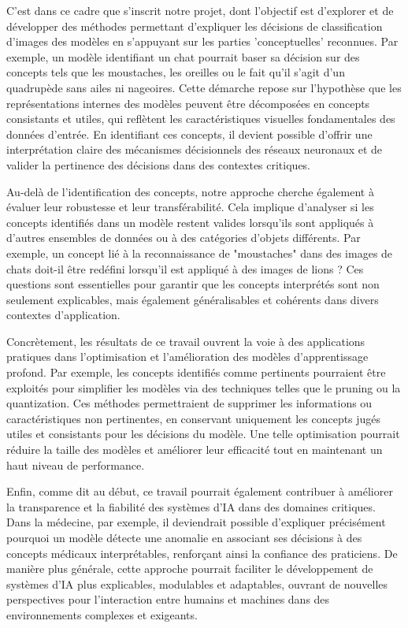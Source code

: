 \documentclass[runningheads]{llncs}
\begin{document}
C’est dans ce cadre que s’inscrit notre projet, dont l’objectif est d’explorer et de développer des méthodes permettant d’expliquer les décisions de classification d’images des modèles en s’appuyant sur les parties 'conceptuelles' reconnues. Par exemple, un modèle identifiant un chat pourrait baser sa décision sur des concepts tels que les moustaches, les oreilles ou le fait qu’il s’agit d’un quadrupède sans ailes ni nageoires. Cette démarche repose sur l’hypothèse que les représentations internes des modèles peuvent être décomposées en concepts consistants et utiles, qui reflètent les caractéristiques visuelles fondamentales des données d’entrée. En identifiant ces concepts, il devient possible d’offrir une interprétation claire des mécanismes décisionnels des réseaux neuronaux et de valider la pertinence des décisions dans des contextes critiques.
\bigskip

Au-delà de l’identification des concepts, notre approche cherche également à évaluer leur robustesse et leur transférabilité. Cela implique d’analyser si les concepts identifiés dans un modèle restent valides lorsqu’ils sont appliqués à d’autres ensembles de données ou à des catégories d’objets différents. Par exemple, un concept lié à la reconnaissance de "moustaches" dans des images de chats doit-il être redéfini lorsqu’il est appliqué à des images de lions ? Ces questions sont essentielles pour garantir que les concepts interprétés sont non seulement explicables, mais également généralisables et cohérents dans divers contextes d’application.
\bigskip

Concrètement, les résultats de ce travail ouvrent la voie à des applications pratiques dans l’optimisation et l’amélioration des modèles d’apprentissage profond. Par exemple, les concepts identifiés comme pertinents pourraient être exploités pour simplifier les modèles via des techniques telles que le pruning ou la quantization. Ces méthodes permettraient de supprimer les informations ou caractéristiques non pertinentes, en conservant uniquement les concepts jugés utiles et consistants pour les décisions du modèle. Une telle optimisation pourrait réduire la taille des modèles et améliorer leur efficacité tout en maintenant un haut niveau de performance.
\bigskip

Enfin, comme dit au début, ce travail pourrait également contribuer à améliorer la transparence et la fiabilité des systèmes d’IA dans des domaines critiques. Dans la médecine, par exemple, il deviendrait possible d’expliquer précisément pourquoi un modèle détecte une anomalie en associant ses décisions à des concepts médicaux interprétables, renforçant ainsi la confiance des praticiens. De manière plus générale, cette approche pourrait faciliter le développement de systèmes d’IA plus explicables, modulables et adaptables, ouvrant de nouvelles perspectives pour l’interaction entre humains et machines dans des environnements complexes et exigeants.
\end{document}
